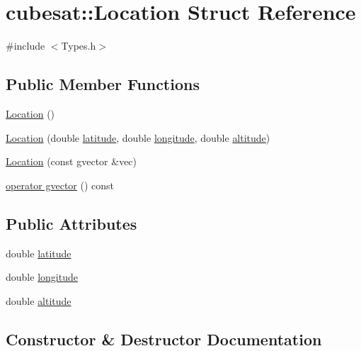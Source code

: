 \hypertarget{structcubesat_1_1Location}{}\section{cubesat\+:\+:Location Struct Reference}
\label{structcubesat_1_1Location}


{\ttfamily \#include $<$Types.\+h$>$}

\subsection*{Public Member Functions}
\begin{DoxyCompactItemize}
\item 
\hyperlink{structcubesat_1_1Location_a9de50e8e989fed1771825ff03e53a3a9}{Location} ()
\item 
\hyperlink{structcubesat_1_1Location_a5bb8201f3d6b276e19b4767fd9bfc7dd}{Location} (double \hyperlink{structcubesat_1_1Location_af14b920a59e1ac2ebdb613e46010fd7e}{latitude}, double \hyperlink{structcubesat_1_1Location_a52b9b8a55bdc7c4c8841e331b2bf981a}{longitude}, double \hyperlink{structcubesat_1_1Location_af010a12e2d638d3a47f2cad83811d95a}{altitude})
\item 
\hyperlink{structcubesat_1_1Location_ac6e05f08da64e8dad865013bcbc27223}{Location} (const gvector \&vec)
\item 
\hyperlink{structcubesat_1_1Location_aeeb4a12c93c721cec692882710cc0823}{operator gvector} () const
\end{DoxyCompactItemize}
\subsection*{Public Attributes}
\begin{DoxyCompactItemize}
\item 
double \hyperlink{structcubesat_1_1Location_af14b920a59e1ac2ebdb613e46010fd7e}{latitude}
\item 
double \hyperlink{structcubesat_1_1Location_a52b9b8a55bdc7c4c8841e331b2bf981a}{longitude}
\item 
double \hyperlink{structcubesat_1_1Location_af010a12e2d638d3a47f2cad83811d95a}{altitude}
\end{DoxyCompactItemize}


\subsection{Constructor \& Destructor Documentation}
\mbox{\label{structcubesat_1_1Location_a9de50e8e989fed1771825ff03e53a3a9}} 
